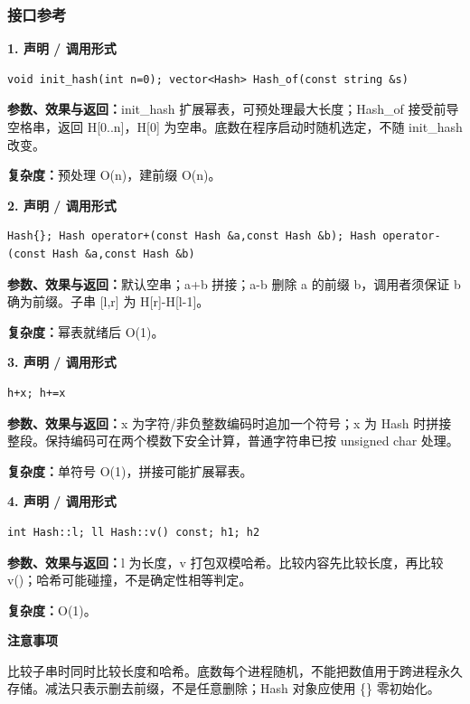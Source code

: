 \documentclass[UTF8,a4paper,10pt]{ctexart}
\newcommand{\TemplNote}[1]{\textbf{注意事项}\par #1\par}
\begin{document}
\subsubsection*{接口参考}
\noindent\begin{minipage}{\textwidth}
\textbf{1. 声明 / 调用形式}
\begin{lstlisting}
void init_hash(int n=0); vector<Hash> Hash_of(const string &s)
\end{lstlisting}
\textbf{参数、效果与返回：}init\_hash 扩展幂表，可预处理最大长度；Hash\_of 接受前导空格串，返回 H[0..n]，H[0] 为空串。底数在程序启动时随机选定，不随 init\_hash 改变。

\textbf{复杂度：}预处理 O(n)，建前缀 O(n)。

\end{minipage}\par\vspace{0.4em}
\noindent\begin{minipage}{\textwidth}
\textbf{2. 声明 / 调用形式}
\begin{lstlisting}
Hash{}; Hash operator+(const Hash &a,const Hash &b); Hash operator-(const Hash &a,const Hash &b)
\end{lstlisting}
\textbf{参数、效果与返回：}默认空串；a+b 拼接；a-b 删除 a 的前缀 b，调用者须保证 b 确为前缀。子串 [l,r] 为 H[r]-H[l-1]。

\textbf{复杂度：}幂表就绪后 O(1)。

\end{minipage}\par\vspace{0.4em}
\noindent\begin{minipage}{\textwidth}
\textbf{3. 声明 / 调用形式}
\begin{lstlisting}
h+x; h+=x
\end{lstlisting}
\textbf{参数、效果与返回：}x 为字符/非负整数编码时追加一个符号；x 为 Hash 时拼接整段。保持编码可在两个模数下安全计算，普通字符串已按 unsigned char 处理。

\textbf{复杂度：}单符号 O(1)，拼接可能扩展幂表。

\end{minipage}\par\vspace{0.4em}
\noindent\begin{minipage}{\textwidth}
\textbf{4. 声明 / 调用形式}
\begin{lstlisting}
int Hash::l; ll Hash::v() const; h1; h2
\end{lstlisting}
\textbf{参数、效果与返回：}l 为长度，v 打包双模哈希。比较内容先比较长度，再比较 v()；哈希可能碰撞，不是确定性相等判定。

\textbf{复杂度：}O(1)。

\TemplNote{比较子串时同时比较长度和哈希。底数每个进程随机，不能把数值用于跨进程永久存储。减法只表示删去前缀，不是任意删除；Hash 对象应使用 \{\} 零初始化。}
\end{minipage}\par\vspace{0.4em}
\clearpage
\end{document}
